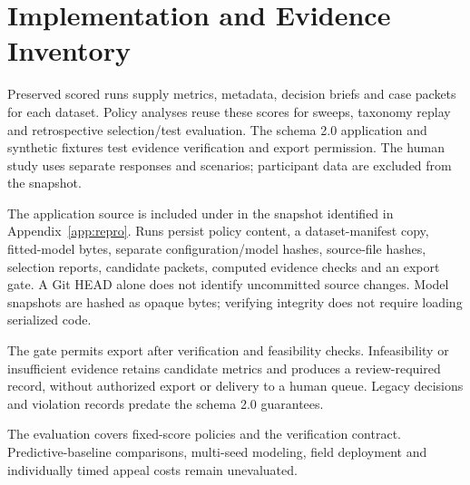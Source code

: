 \section{Implementation and Evidence Inventory}
\label{app:implementation}
Preserved scored runs supply metrics, metadata, decision briefs and case packets for each dataset. Policy analyses reuse these scores for sweeps, taxonomy replay and retrospective selection/test evaluation. The schema 2.0 application and synthetic fixtures test evidence verification and export permission. The human study uses separate responses and scenarios; participant data are excluded from the snapshot.

The application source is included under  in the snapshot identified in Appendix~\ref{app:repro}. Runs persist policy content, a dataset-manifest copy, fitted-model bytes, separate configuration/model hashes, source-file hashes, selection reports, candidate packets, computed evidence checks and an export gate. A Git HEAD alone does not identify uncommitted source changes. Model snapshots are hashed as opaque bytes; verifying integrity does not require loading serialized code.

The gate permits export after verification and feasibility checks. Infeasibility or insufficient evidence retains candidate metrics and produces a review-required record, without authorized export or delivery to a human queue. Legacy decisions and violation records predate the schema 2.0 guarantees.

The evaluation covers fixed-score policies and the verification contract. Predictive-baseline comparisons, multi-seed modeling, field deployment and individually timed appeal costs remain unevaluated.
